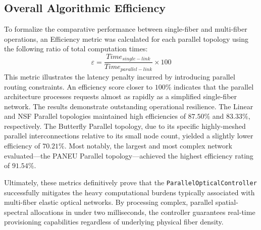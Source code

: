 \subsection*{\small Overall Algorithmic Efficiency}
To formalize the comparative performance between single-fiber and multi-fiber operations, an Efficiency metric was calculated for each parallel topology using the following ratio of total computation times:
\[
    \varepsilon=\frac{Time_{single-link}}{Time_{parallel-link}}\times 100
\]
This metric illustrates the latency penalty incurred by introducing parallel routing constraints. An efficiency score closer to $100\%$ indicates that the parallel architecture processes requests almost as rapidly as a simplified single-fiber network. The results demonstrate outstanding operational resilience. The Linear and NSF Parallel topologies maintained high efficiencies of $87.50\%$ and $83.33\%$, respectively. The Butterfly Parallel topology, due to its specific highly-meshed parallel interconnections relative to its small node count, yielded a slightly lower efficiency of $70.21\%$. Most notably, the largest and most complex network evaluated—the PANEU Parallel topology—achieved the highest efficiency rating of $91.54\%$.

Ultimately, these metrics definitively prove that the \texttt{ParallelOpticalController} successfully mitigates the heavy computational burdens typically associated with multi-fiber elastic optical networks. By processing complex, parallel spatial-spectral allocations in under two milliseconds, the controller guarantees real-time provisioning capabilities regardless of underlying physical fiber density.

